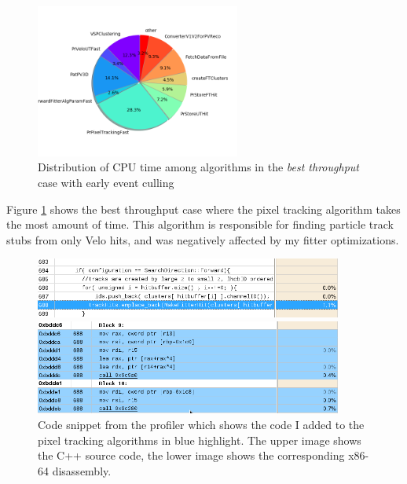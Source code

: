 \documentclass[12pt]{article}
\begin{document}
\begin{figure}[H]
	\begin{center}
		\includegraphics[width=0.6\textwidth]{algo_usage_original_bestthru}
	\end{center}
	\caption{Distribution of CPU time among algorithms in the \textit{best throughput} case with early event culling}
	\label{fig_algo_usage_original_bestthru}
\end{figure}

Figure \ref{fig_algo_usage_original_bestthru} shows the best throughput case where the pixel tracking algorithm takes the most amount of time. This algorithm is responsible for finding particle track stubs from only Velo hits, and was negatively affected by my fitter optimizations.

\begin{figure}[H]
	\begin{center}
		\includegraphics[width=0.9\textwidth]{kalmanfit_disasm_opt_src_naive}
	\end{center}
	\begin{center}
		\includegraphics[width=0.9\textwidth]{kalmanfit_disasm_opt_asm_naive}
	\end{center}
	\caption{Code snippet from the profiler which shows the code I added to the pixel tracking algorithms in blue highlight. The upper image shows the C++ source code, the lower image shows the corresponding x86-64 disassembly.}
	\label{fig_kalman_disasm_src_naive}
\end{figure}
\end{document}
